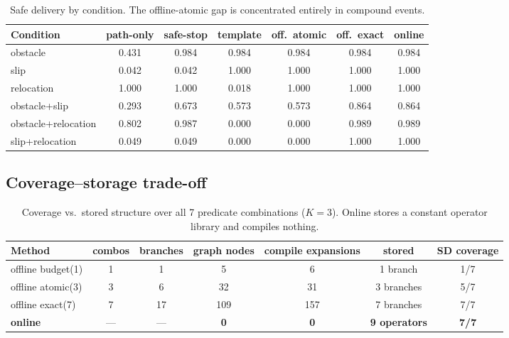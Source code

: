 \documentclass[11pt]{article}
\begin{document}
\begin{table}[htbp]\centering
\caption{Safe delivery by condition. The offline-atomic gap is concentrated
entirely in compound events.}
\begin{tabular}{lcccccc}
\toprule
Condition & path-only & safe-stop & template & off.\ atomic & off.\ exact & online \\
\midrule
obstacle             & 0.431 & 0.984 & 0.984 & 0.984 & 0.984 & 0.984 \\
slip                 & 0.042 & 0.042 & 1.000 & 1.000 & 1.000 & 1.000 \\
relocation           & 1.000 & 1.000 & 0.018 & 1.000 & 1.000 & 1.000 \\
obstacle+slip        & 0.293 & 0.673 & 0.573 & 0.573 & 0.864 & 0.864 \\
obstacle+relocation  & 0.802 & 0.987 & 0.000 & 0.000 & 0.989 & 0.989 \\
slip+relocation      & 0.049 & 0.049 & 0.000 & 0.000 & 1.000 & 1.000 \\
\bottomrule
\end{tabular}
\end{table}

\subsection{Coverage--storage trade-off}

\begin{table}[htbp]\centering
\caption{Coverage vs.\ stored structure over all 7 predicate combinations
($K=3$). Online stores a constant operator library and compiles nothing.}
\begin{tabular}{lcccccc}
\toprule
Method & combos & branches & graph nodes & compile expansions & stored & SD coverage \\
\midrule
offline budget(1)  & 1 & 1  & 5   & 6   & 1 branch      & 1/7 \\
offline atomic(3)  & 3 & 6  & 32  & 31  & 3 branches    & 5/7 \\
offline exact(7)   & 7 & 17 & 109 & 157 & 7 branches    & 7/7 \\
\textbf{online}    & --- & --- & \textbf{0} & \textbf{0} & \textbf{9 operators} & \textbf{7/7} \\
\bottomrule
\end{tabular}
\end{table}
\end{document}
